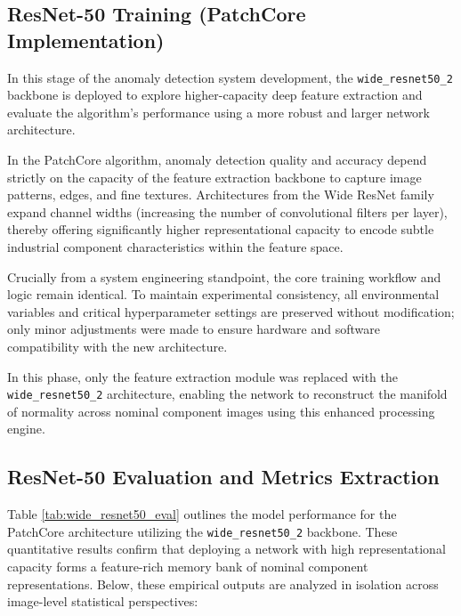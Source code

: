 \documentclass{article}
\begin{document}
\subsection{ResNet-50 Training (PatchCore Implementation)}

In this stage of the anomaly detection system development, the \texttt{wide\_resnet50\_2} backbone is deployed to explore higher-capacity deep feature extraction and evaluate the algorithm's performance using a more robust and larger network architecture.

In the PatchCore algorithm, anomaly detection quality and accuracy depend strictly on the capacity of the feature extraction backbone to capture image patterns, edges, and fine textures. Architectures from the Wide ResNet family expand channel widths (increasing the number of convolutional filters per layer), thereby offering significantly higher representational capacity to encode subtle industrial component characteristics within the feature space.

Crucially from a system engineering standpoint, the core training workflow and logic remain identical. To maintain experimental consistency, all environmental variables and critical hyperparameter settings are preserved without modification; only minor adjustments were made to ensure hardware and software compatibility with the new architecture.

In this phase, only the feature extraction module was replaced with the \texttt{wide\_resnet50\_2} architecture, enabling the network to reconstruct the manifold of normality across nominal component images using this enhanced processing engine.



\subsection{ResNet-50 Evaluation and Metrics Extraction}
\label{subsec:RS50}

Table \ref{tab:wide_resnet50_eval} outlines the model performance for the PatchCore architecture utilizing the \texttt{wide\_resnet50\_2} backbone. These quantitative results confirm that deploying a network with high representational capacity forms a feature-rich memory bank of nominal component representations. Below, these empirical outputs are analyzed in isolation across image-level statistical perspectives:
\end{document}
